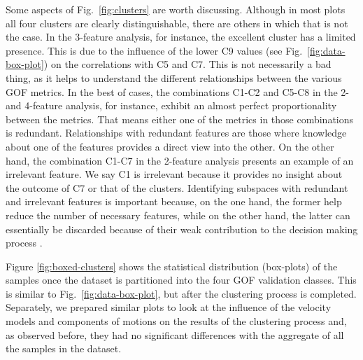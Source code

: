 Some aspects of Fig.~\ref{fig:clusters} are worth discussing. Although in most plots all four clusters are clearly distinguishable, there are others in which that is not the case. In 
the 3-feature analysis, for instance, the excellent cluster has a limited presence. This is due to the influence of the lower C9 values (see Fig.~\ref{fig:data-box-plot}) on the correlations with C5 and C7. This is not necessarily a bad thing, as it helps to understand the different relationships between the various GOF metrics. In the best of cases, the combinations C1-C2 and C5-C8 in the 2- and 4-feature analysis, for instance, exhibit an almost perfect proportionality between the metrics. That means either one of the metrics in those combinations is redundant. Relationships with redundant features are those where knowledge about one of the features provides a direct view into the other. On the other hand, the combination C1-C7 in the 2-feature analysis presents an example of an irrelevant feature. We say C1 is irrelevant because it provides no insight about the outcome of C7 or that of the clusters. Identifying subspaces with redundant and irrelevant features is important because, on the one hand, the former help reduce the number of necessary features, while on the other hand, the latter can essentially be discarded because of their weak contribution to the decision making process \citep{Dy_2004_MLR}.

Figure \ref{fig:boxed-clusters} shows the statistical distribution (box-plots) of the samples once the dataset is partitioned into the four GOF validation classes. This is similar to Fig.~\ref{fig:data-box-plot}, but after the clustering process is completed. Separately, we prepared similar plots to look at the influence of the velocity models and components of motions on the results of the clustering process and, as observed before, they had no significant differences with the aggregate of all the samples in the dataset. 

